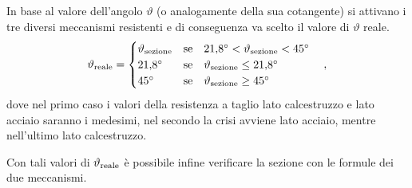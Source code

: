 In base al valore dell'angolo $\vartheta$ (o analogamente della sua cotangente) si attivano i tre diversi meccanismi resistenti e di conseguenza va scelto il valore di $\vartheta$ reale.
\begin{equation}
    \vartheta_\textup{reale} = 
\begin{cases}
    \vartheta_\textup{sezione} & \text{se} \quad \SI{21.8}{\degree}<\vartheta_\textup{sezione}<\SI{45}{\degree} \\
    \SI{21.8}{\degree} & \text{se} \quad \vartheta_\textup{sezione}\leq\SI{21.8}{\degree} \\
    \SI{45}{\degree} & \text{se} \quad \vartheta_\textup{sezione}\geq\SI{45}{\degree} \\
\end{cases}\quad,
\end{equation} 
dove nel primo caso i valori della resistenza a taglio lato calcestruzzo e lato acciaio saranno i medesimi, nel secondo la crisi avviene lato acciaio, mentre nell'ultimo lato calcestruzzo.

Con tali valori di $\vartheta_\textup{reale}$ è possibile infine verificare la sezione con le formule dei due meccanismi.

